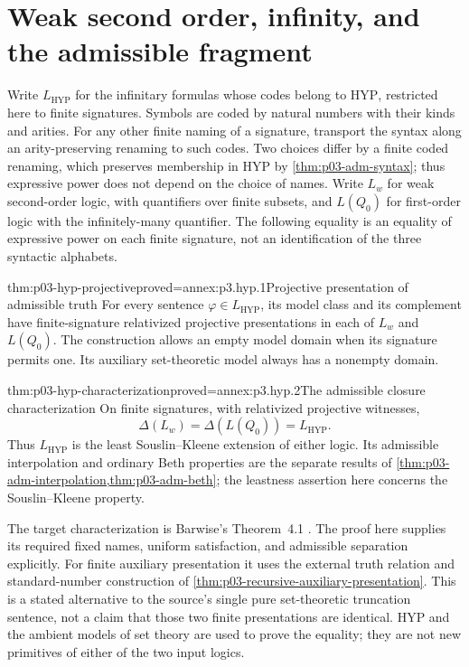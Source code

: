 \section{Weak second order, infinity, and the admissible fragment}
\label{sec:p03-hyp-characterization}

Write \(L_{\mathrm{HYP}}\) for the infinitary formulas whose codes
belong to \(\mathrm{HYP}\), restricted here to finite signatures.
Symbols are coded by natural numbers with their kinds and arities.
For any other finite naming of a signature, transport the syntax along
an arity-preserving renaming to such codes. Two choices differ by a
finite coded renaming, which preserves membership in \(\mathrm{HYP}\)
by \cref{thm:p03-adm-syntax}; thus expressive power does not depend on
the choice of names.
Write \(L_w\) for weak second-order logic, with quantifiers over
finite subsets, and \(L(Q_0)\) for first-order logic with the
infinitely-many quantifier. The following equality is an equality of
expressive power on each finite signature, not an identification of
the three syntactic alphabets.

\begin{hblemma}{thm:p03-hyp-projective}{proved=annex:p3.hyp.1}{Projective presentation of admissible truth}
For every sentence \(\varphi\in L_{\mathrm{HYP}}\), its model class
and its complement have finite-signature relativized projective
presentations in each of \(L_w\) and \(L(Q_0)\).
The construction allows an empty model domain when its signature permits
one. Its auxiliary set-theoretic model always has a nonempty domain.
\end{hblemma}

\begin{hbtheorem}{thm:p03-hyp-characterization}{proved=annex:p3.hyp.2}{The admissible closure characterization}
On finite signatures, with relativized projective witnesses,
\[
 \Delta(L_w)=\Delta(L(Q_0))=L_{\mathrm{HYP}}.
\]
Thus \(L_{\mathrm{HYP}}\) is the least Souslin--Kleene extension of
either logic. Its admissible interpolation and ordinary Beth properties
are the separate results of
\cref{thm:p03-adm-interpolation,thm:p03-adm-beth}; the leastness assertion
here concerns the Souslin--Kleene property.
\end{hbtheorem}

The target characterization is Barwise's Theorem~4.1
\cite[Part~II, \S4, pp.~260--262]{Barwise1974Axioms}.
The proof here supplies its required fixed names, uniform satisfaction,
and admissible separation explicitly. For finite auxiliary presentation
it uses the external truth relation and standard-number construction of
\cref{thm:p03-recursive-auxiliary-presentation}. This is a stated
alternative to the source's single pure set-theoretic truncation
sentence, not a claim that those two finite presentations are identical.
\(\mathrm{HYP}\) and the ambient models of set theory are used to
prove the equality; they are not new primitives of either of the two
input logics.
